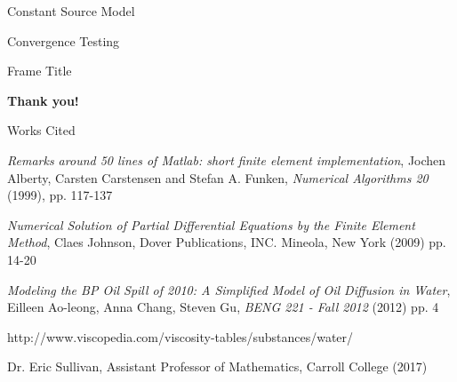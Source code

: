 \documentclass[10pt]{beamer}
\begin{document}
\begin{frame}{Constant Source Model}
  
\end{frame}

\begin{frame} {Convergence Testing}

\end{frame}

\begin{frame}{Frame Title}
    \begin{center}
        {\bf Thank you!}
    \end{center}
\end{frame}

\begin{frame}{Works Cited}
\begin{thebibliography}{4}
\textit{Remarks around 50 lines of Matlab: short finite element implementation}, Jochen Alberty, Carsten Carstensen and Stefan A. Funken, \textit{Numerical Algorithms 20} (1999), pp. 117-137

\textit{Numerical Solution of Partial Differential Equations by the Finite Element Method}, Claes Johnson, Dover Publications, INC. Mineola, New York (2009) pp. 14-20

\textit{Modeling the BP Oil Spill of 2010: A Simplified Model of Oil Diffusion in Water}, Eilleen Ao-leong, Anna Chang, Steven Gu, \textit{BENG 221 - Fall 2012} (2012) pp. 4

http://www.viscopedia.com/viscosity-tables/substances/water/

Dr. Eric Sullivan, Assistant Professor of Mathematics, Carroll College (2017)

\end{thebibliography}
\end{frame}
\end{document}
